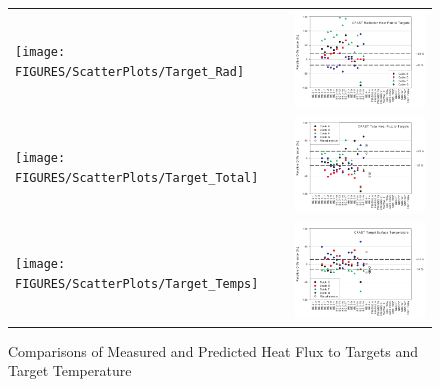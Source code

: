 \begin{figure}[p]
\begin{center}
\begin{tabular}{lr}
\texttt{[image: FIGURES/ScatterPlots/Target\_Rad]} & \includegraphics[width=3.5in]{FIGURES/Relative_Diff/Target_Rad}  \\
\texttt{[image: FIGURES/ScatterPlots/Target\_Total]} & \includegraphics[width=3.5in]{FIGURES/Relative_Diff/Target_Total}  \\
\texttt{[image: FIGURES/ScatterPlots/Target\_Temps]} & \includegraphics[width=3.5in]{FIGURES/Relative_Diff/Target_Temps}
\end{tabular}
\end{center}
\caption{Comparisons of Measured and Predicted Heat Flux to Targets and Target Temperature} \label{fig:Target_Scatter}
\end{figure}

